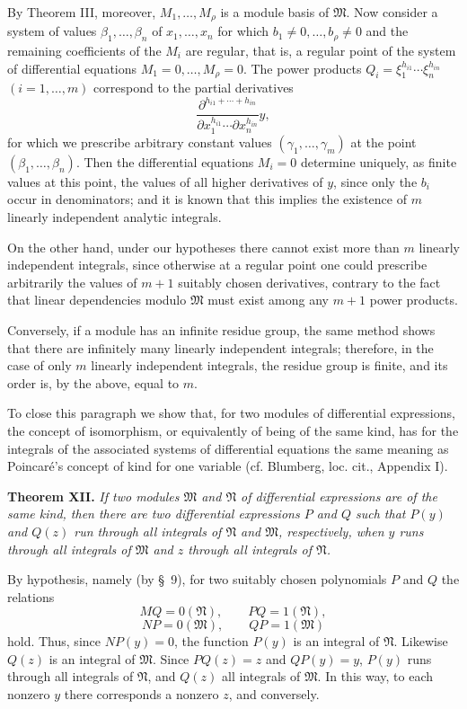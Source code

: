 \documentclass[11pt]{article}
\begin{document}
By Theorem III, moreover, $M_1,
\ldots,M_\rho$ is a module basis of $\mathfrak M$. Now consider a system of values $\beta_1,
\ldots,\beta_n$ of $x_1,
\ldots,x_n$ for which $b_1\ne0,
\ldots,b_\rho\ne0$ and the remaining coefficients of the $M_i$ are regular, that is, a regular point of the system of differential equations $M_1=0,
\ldots,M_\rho=0$. The power products $Q_i=\xi_1^{h_{i1}}\cdots\xi_n^{h_{in}}$ $(i=1,
\ldots,m)$ correspond to the partial derivatives
\[
 \frac{\partial^{h_{i1}+\cdots+h_{in}}}{\partial x_1^{h_{i1}}\cdots\partial x_n^{h_{in}}}y,
\]
for which we prescribe arbitrary constant values $(\gamma_1,
\ldots,
\gamma_m)$ at the point $(\beta_1,
\ldots,\beta_n)$. Then the differential equations $M_i=0$ determine uniquely, as finite values at this point, the values of all higher derivatives of $y$, since only the $b_i$ occur in denominators; and it is known that this implies the existence of $m$ linearly independent analytic integrals.

On the other hand, under our hypotheses there cannot exist more than $m$ linearly independent integrals, since otherwise at a regular point one could prescribe arbitrarily the values of $m+1$ suitably chosen derivatives, contrary to the fact that linear dependencies modulo $\mathfrak M$ must exist among any $m+1$ power products.

Conversely, if a module has an infinite residue group, the same method shows that there are infinitely many linearly independent integrals; therefore, in the case of only $m$ linearly independent integrals, the residue group is finite, and its order is, by the above, equal to $m$.

To close this paragraph we show that, for two modules of differential expressions, the concept of isomorphism, or equivalently of being of the same kind, has for the integrals of the associated systems of differential equations the same meaning as Poincaré's concept of kind for one variable (cf. Blumberg, loc. cit., Appendix I).

\textbf{Theorem XII.} \emph{If two modules $\mathfrak M$ and $\mathfrak N$ of differential expressions are of the same kind, then there are two differential expressions $P$ and $Q$ such that $P(y)$ and $Q(z)$ run through all integrals of $\mathfrak N$ and $\mathfrak M$, respectively, when $y$ runs through all integrals of $\mathfrak M$ and $z$ through all integrals of $\mathfrak N$.}

By hypothesis, namely (by \S~9), for two suitably chosen polynomials $P$ and $Q$ the relations
\[
 MQ=0(\mathfrak N),
 \qquad
 PQ=1(\mathfrak N),
\]
\[
 NP=0(\mathfrak M),
 \qquad
 QP=1(\mathfrak M)
\]
hold. Thus, since $NP(y)=0$, the function $P(y)$ is an integral of $\mathfrak N$. Likewise $Q(z)$ is an integral of $\mathfrak M$. Since $PQ(z)=z$ and $QP(y)=y$, $P(y)$ runs through all integrals of $\mathfrak N$, and $Q(z)$ all integrals of $\mathfrak M$. In this way, to each nonzero $y$ there corresponds a nonzero $z$, and conversely.
\end{document}
